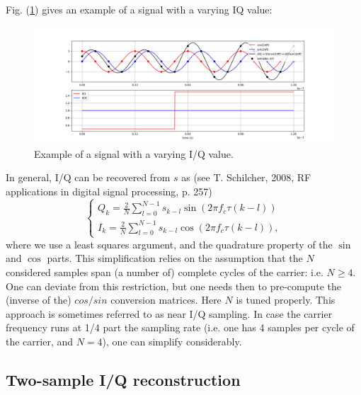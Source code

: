 \documentclass[12pt]{amsart}
\begin{document}
Fig. (\ref{fig:iq2}) gives an example of a signal with a varying IQ value:

\begin{figure}[htbp] %
   \centering
   \includegraphics[width=5in]{im/iq2.png} 
   \caption{Example of a signal with a varying I/Q value.}
   \label{fig:iq2}
\end{figure}

In general, I/Q can be recovered from $s$ as 
(see T. Schilcher, 2008, RF applications in digital signal processing, p. 257)
\begin{equation}
	\begin{cases}
		Q_k = \frac{2}{N} \sum_{l=0}^{N-1} s_{k-l} \sin\left(2\pi f_c \tau (k-l)\right) \\
		I_k = \frac{2}{N} \sum_{l=0}^{N-1} s_{k-l} \cos\left(2\pi f_c \tau (k-l)\right),
	\end{cases}
	\label{eq.neariq}
\end{equation}
where we use a least squares argument, and the quadrature property of the $\sin$ and $\cos$ parts.
This simplification relies on the assumption that the $N$ considered samples span (a number of) complete cycles of the carrier:
i.e. $N\geq 4$.
One can deviate from this restriction, but one needs then to pre-compute the (inverse of the) $cos/sin$ conversion matrices. 
Here $N$ is tuned properly.
This approach is sometimes referred to as near I/Q sampling.
In case the carrier frequency runs at 1/4 part the sampling rate (i.e. one has 4 samples per cycle of the carrier, and $N=4$),
one can simplify considerably.






\subsection{Two-sample I/Q reconstruction}
\end{document}

